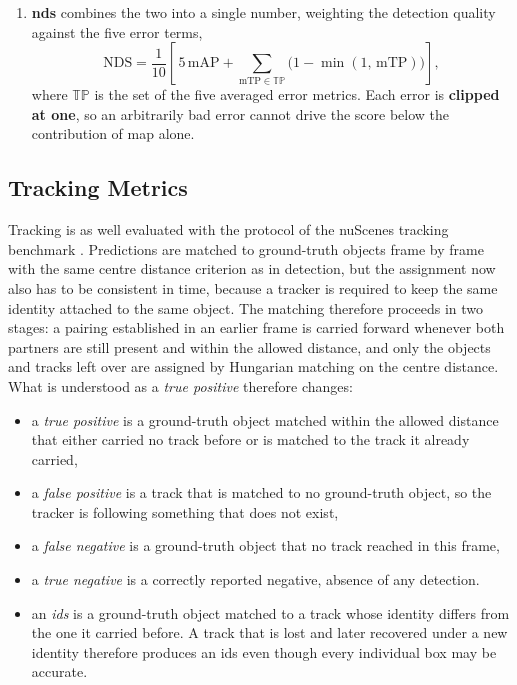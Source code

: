 \begin{enumerate}
    \item \textbf{\Acf{nds}} combines the two into a single number, weighting the detection quality against
    the five error terms,
    \begin{equation}
        \mathrm{NDS} = \frac{1}{10}\left[\, 5\,\mathrm{mAP} +
        \sum_{\mathrm{mTP} \in \mathbb{TP}} \big(1 - \min(1,\, \mathrm{mTP})\big) \right],
        \label{eq:nds}
    \end{equation}
    where \(\mathbb{TP}\) is the set of the five averaged error metrics. Each error is \textbf{clipped at one}, so an
    arbitrarily bad error cannot drive the score below the contribution of \acs{map} alone.
\end{enumerate}

\subsection{Tracking Metrics}

\label{subsec:sota-metrics-track}

Tracking is as well evaluated with the protocol of the nuScenes tracking benchmark \cite{Caesar2020nuScenes}.
Predictions are matched to ground-truth objects frame by frame with the same centre distance criterion as
in detection, but the assignment now also has to be consistent in time, because a tracker is required to
keep the same identity attached to the same object. The matching therefore proceeds in two stages: a
pairing established in an earlier frame is carried forward whenever both partners are still present and
within the allowed distance, and only the objects and tracks left over are assigned by Hungarian
matching on the centre distance. What is understood as a \emph{true positive} therefore changes:

\begin{itemize}
    \item a \emph{true positive} is a ground-truth object matched within the allowed distance that
    either carried no track before or is matched to the track it already carried,
    \item a \emph{false positive} is a track that is matched to no ground-truth object, so the tracker is
    following something that does not exist,
    \item a \emph{false negative} is a ground-truth object that no track reached in this frame,
    \item a \emph{true negative} is a correctly reported negative, absence of any detection. 
    \item an \emph{\acf{ids}} is a ground-truth object matched to a track whose identity differs from the one it
    carried before. A track that
    is lost and later recovered under a new identity therefore produces an \acs{ids} even though every
    individual box may be accurate.
\end{itemize}

